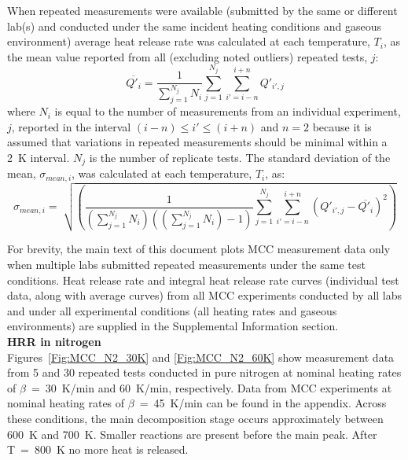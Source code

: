 \documentclass{book}
\begin{document}
When repeated measurements were available (submitted by the same or different lab(s) and conducted under the same incident heating conditions and gaseous environment) average heat release rate was calculated at each temperature, $T_i$, as the mean value reported from all (excluding noted outliers) repeated tests, $j$:
\begin{equation}
	\overline{Q'_i} = \frac{1}{\sum_{j=1}^{N_j}N_i} \sum_{j=1}^{N_j} \sum_{i'=i-n}^{i+n} Q'_{i',j}
\end{equation}
where $N_i$ is equal to the number of measurements from an individual experiment, $j$, reported in the interval $(i-n) \leq i' \leq (i+n)$ and $n=2$ because it is assumed that variations in repeated measurements should be minimal within a 2~K interval. $N_j$ is the number of replicate tests. The standard deviation of the mean, $\sigma_{mean,i}$, was calculated at each temperature, $T_i$, as:
\begin{equation}
	\sigma_{mean,i} = \sqrt[]{\left(\frac{1}{(\sum_{j=1}^{N_j}N_i)((\sum_{j=1}^{N_j}N_i)-1)} \sum_{j=1}^{N_j} \sum_{i'=i-n}^{i+n} \left( Q'_{i',j} - \overline{Q'_i} \right)^{2}\right)}
\end{equation}

For brevity, the main text of this document plots MCC measurement data only when multiple labs submitted repeated measurements under the same test conditions. Heat release rate and integral heat release rate curves (individual test data, along with average curves) from all MCC experiments conducted by all labs and under all experimental conditions (all heating rates and gaseous environments) are supplied in the Supplemental Information section.\\


\textbf{HRR in nitrogen}\\
Figures~\ref{Fig:MCC_N2_30K} and \ref{Fig:MCC_N2_60K} show measurement data from 5 and 30 repeated tests conducted in pure nitrogen at nominal heating rates of $\beta$~=~30~K/min and 60~K/min, respectively. Data from MCC experiments at nominal heating rates of $\beta$~=~45~K/min can be found in the appendix. Across these conditions, the main decomposition stage occurs approximately between 600~K and 700~K. Smaller reactions are present before the main peak. After T~=~800~K no more heat is released.
\end{document}
